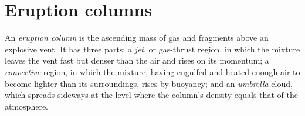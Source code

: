 \section{Eruption columns}

\begin{definition}\label{def:b2:eruptive-styles:column}
An \emph{eruption column} is the ascending mass of gas and
fragments above an explosive vent. It has three parts: a \emph{jet}, or
gas-thrust region, in which the mixture leaves the vent fast but denser than the
air and rises on its momentum; a \emph{convective} region, in which the mixture,
having engulfed and heated enough air to become lighter than its surroundings,
rises by buoyancy; and an \emph{umbrella} cloud, which spreads sideways at the
level where the column's density equals that of the atmosphere.
\end{definition}

